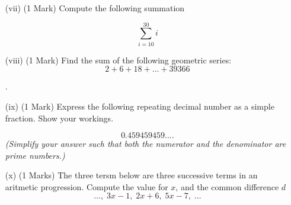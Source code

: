 \documentclass[11pt]{article} %
\begin{document}
\begin{enumerate} %
	\item[(vii)](1 Mark) Compute the following summation
	
	\[ \sum_{i=10}^{30} i \]

	\vspace{5.5cm}
	\item[(viii)] (1 Mark) Find the sum of the following geometric series: 
		\[2 + 6 + 18 +  \ldots + 39366		\]



\newpage
.
\newpage	
	\item[(ix)] (1 Mark) Express the following repeating decimal number as a simple fraction. Show your workings.
	
	\[0.459459459....\]
\textit{(Simplify your answer such that both the numerator and the denominator are prime numbers.)}
	\vspace{5.5cm}

	\item[(x)] (1 Marks) The three tersm below are three successive terms in an aritmetic progression. Compute the value for $x$, and the common difference $d$
		\[ \ldots,\; 3x-1,\; 2x+6,\;	5x-7,\; \ldots		  \]
		
\end{enumerate}
\end{document}
